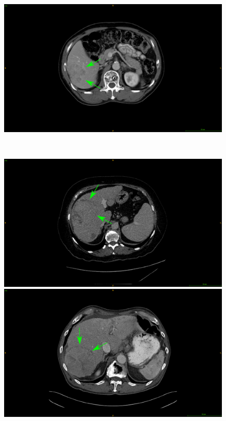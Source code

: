 \documentclass[]{article}
\begin{document}
\begin{figure}[!h]
\begin{minipage}{0.45\linewidth}
	\end{minipage} \hspace{-0.1cm}
	\begin{minipage}{0.45\linewidth}
		\includegraphics[width=\linewidth]{../Contributions/images/ImagingTraits/ResizeTCIA_nonSmoothMargins}
	\end{minipage} \\
	\begin{minipage}{0.45\linewidth}
		\includegraphics[width=\linewidth]{../Contributions/images/ImagingTraits/ResizeGDB_halo}
	\end{minipage} \hspace{-0.1cm}
	\begin{minipage}{0.45\linewidth}
		\includegraphics[width=\linewidth]{../Contributions/images/ImagingTraits/ResizeTCIA_halo}

\end{minipage}
\end{figure}
\end{document}
